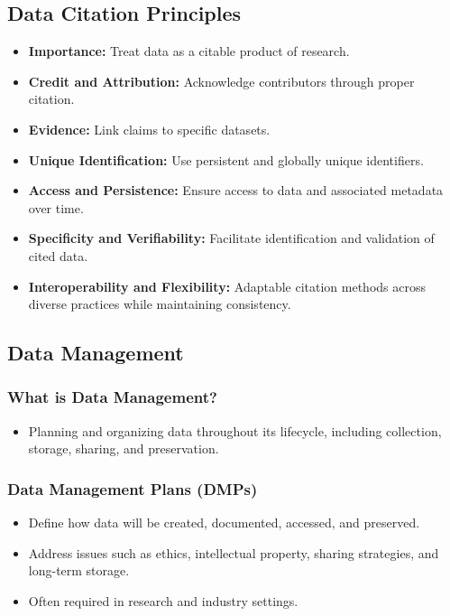 \subsection{Data Citation Principles}
\begin{itemize}
    \item \textbf{Importance:} Treat data as a citable product of research.
    \item \textbf{Credit and Attribution:} Acknowledge contributors through proper citation.
    \item \textbf{Evidence:} Link claims to specific datasets.
    \item \textbf{Unique Identification:} Use persistent and globally unique identifiers.
    \item \textbf{Access and Persistence:} Ensure access to data and associated metadata over time.
    \item \textbf{Specificity and Verifiability:} Facilitate identification and validation of cited data.
    \item \textbf{Interoperability and Flexibility:} Adaptable citation methods across diverse practices while maintaining consistency.
\end{itemize}

\subsection{Data Management}
\subsubsection{What is Data Management?}
\begin{itemize}
    \item Planning and organizing data throughout its lifecycle, including collection, storage, sharing, and preservation.
\end{itemize}

\subsubsection{Data Management Plans (DMPs)}
\begin{itemize}
    \item Define how data will be created, documented, accessed, and preserved.
    \item Address issues such as ethics, intellectual property, sharing strategies, and long-term storage.
    \item Often required in research and industry settings.
\end{itemize}

